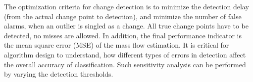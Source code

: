 \documentclass{llncs}
\begin{document}
The optimization criteria for change detection is to minimize the detection delay (from the actual change point to detection), and minimize the number of false alarms, when an outlier is singled as a change.  All true change points have to be detected, no  misses are allowed.
In addition, the final performance indicator is the mean square error (MSE) of the mass flow estimation. It is critical for algorithm design to understand, how different types of errors in detection affect the overall accuracy of classification. Such sensitivity analysis can be performed by varying the detection thresholds.


%
%
%
\end{document}
